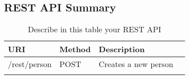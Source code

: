 \newpage
\subsection{REST API Summary}


\begin{longtable}{|p{}|p{} |p{}|p{}|} 
\hline
\textbf{URI} & \textbf{Method} & \textbf{Description} \\\hline
/rest/person & POST & Creates a new person \\\hline
\caption{Describe in this table your REST API}
\label{tab:termGlossary}
\end{longtable}